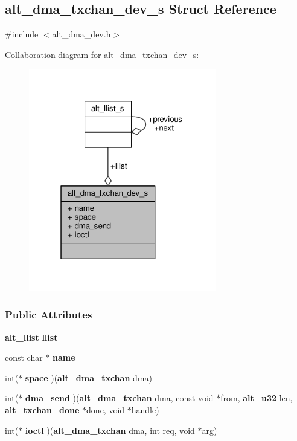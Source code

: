 \subsection{alt\+\_\+dma\+\_\+txchan\+\_\+dev\+\_\+s Struct Reference}
\label{structalt__dma__txchan__dev__s}


{\ttfamily \#include $<$alt\+\_\+dma\+\_\+dev.\+h$>$}



Collaboration diagram for alt\+\_\+dma\+\_\+txchan\+\_\+dev\+\_\+s\+:
\nopagebreak
\begin{figure}[H]
\begin{center}
\leavevmode
\includegraphics[width=232pt]{d0/d48/structalt__dma__txchan__dev__s__coll__graph}
\end{center}
\end{figure}
\subsubsection*{Public Attributes}
\begin{DoxyCompactItemize}
\item 
{\bf alt\+\_\+llist} {\bf llist}
\item 
const char $\ast$ {\bf name}
\item 
int($\ast$ {\bf space} )({\bf alt\+\_\+dma\+\_\+txchan} dma)
\item 
int($\ast$ {\bf dma\+\_\+send} )({\bf alt\+\_\+dma\+\_\+txchan} dma, const void $\ast$from, {\bf alt\+\_\+u32} len, {\bf alt\+\_\+txchan\+\_\+done} $\ast$done, void $\ast$handle)
\item 
int($\ast$ {\bf ioctl} )({\bf alt\+\_\+dma\+\_\+txchan} dma, int req, void $\ast$arg)
\end{DoxyCompactItemize}


